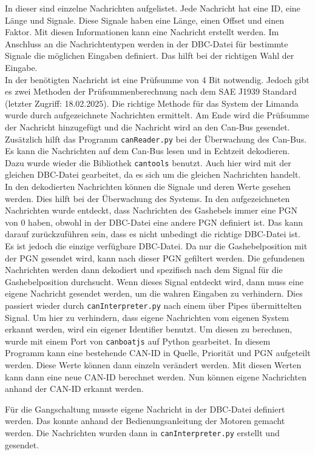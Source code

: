 In dieser sind einzelne Nachrichten aufgelistet. Jede Nachricht hat eine ID, eine Länge und Signale. Diese Signale
haben eine Länge, einen Offset und einen Faktor. Mit diesen Informationen kann eine Nachricht erstellt werden.
Im Anschluss an die Nachrichtentypen werden in der DBC-Datei für bestimmte Signale die möglichen Eingaben definiert.
Das hilft bei der richtigen Wahl der Eingabe. \\
In der benötigten Nachricht ist eine Prüfsumme von 4 Bit notwendig. Jedoch gibt es zwei Methoden der Prüfsummenberechnung
nach dem SAE J1939 Standard \cite{VectorSAE} (letzter Zugriff: 18.02.2025). Die richtige Methode für das System der 
Limanda wurde durch aufgezeichnete Nachrichten ermittelt. Am Ende wird die Prüfsumme der Nachricht hinzugefügt und die
Nachricht wird an den Can-Bus gesendet. \\
Zusätzlich hilft das Programm \texttt{canReader.py} bei der Überwachung des Can-Bus. Es kann die Nachrichten auf dem
Can-Bus lesen und in Echtzeit dekodieren. Dazu wurde wieder die Bibliothek \texttt{cantools} benutzt. Auch hier wird
mit der gleichen DBC-Datei gearbeitet, da es sich um die gleichen Nachrichten handelt. In den dekodierten Nachrichten
können die Signale und deren Werte gesehen werden. Dies hilft bei der Überwachung des Systems. 
In den aufgezeichneten Nachrichten wurde entdeckt, dass Nachrichten des Gashebels
immer eine PGN von 0 haben, obwohl in der DBC-Datei eine andere PGN definiert ist. Das kann darauf zurückzuführen sein, dass
es nicht unbedingt die richtige DBC-Datei ist. Es ist jedoch die einzige verfügbare DBC-Datei. Da nur die Gashebelposition
mit der PGN gesendet wird, kann nach dieser PGN gefiltert werden. Die gefundenen Nachrichten werden dann dekodiert und
spezifisch nach
dem Signal für die Gashebelposition durchsucht. 
Wenn dieses Signal entdeckt wird, dann muss eine eigene Nachricht
gesendet werden, um die wahren Eingaben zu verhindern. Dies passiert wieder durch \texttt{canInterpreter.py} nach 
einem über Pipes übermittelten Signal. Um hier zu verhindern, dass eigene Nachrichten vom eigenen System erkannt werden,
wird ein eigener Identifier benutzt. Um diesen zu berechnen, wurde mit einem Port von \texttt{canboatjs} auf Python gearbeitet.
In diesem Programm kann eine bestehende CAN-ID in Quelle, Priorität und PGN aufgeteilt werden. Diese Werte können dann
einzeln verändert werden. Mit diesen Werten kann dann eine neue CAN-ID berechnet werden. Nun können eigene Nachrichten 
anhand der CAN-ID erkannt werden.

Für die Gangschaltung musste eigene Nachricht in der DBC-Datei definiert werden. Das konnte anhand der Bedienungsanleitung
der Motoren gemacht werden. Die Nachrichten wurden dann in \texttt{canInterpreter.py} erstellt und gesendet.

